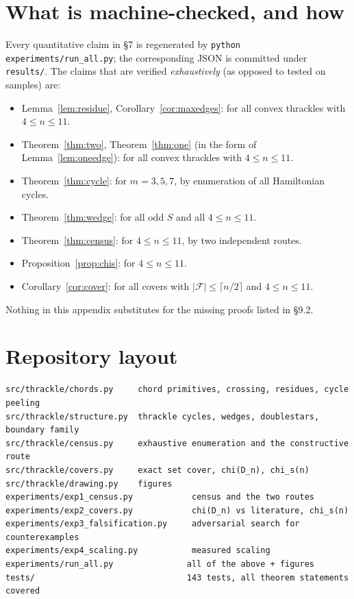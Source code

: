 \documentclass[11pt,a4paper]{article}
\theoremstyle{definition}
\theoremstyle{plain}
\begin{document}
\appendix

\section{What is machine-checked, and how}

Every quantitative claim in §7 is regenerated by
\texttt{python experiments/run\_all.py}; the corresponding JSON is committed
under \texttt{results/}.  The claims that are verified \emph{exhaustively} (as
opposed to tested on samples) are:

\begin{itemize}[leftmargin=*]
\item Lemma~\ref{lem:residue}, Corollary~\ref{cor:maxedges}: for all convex
      thrackles with $4\le n\le11$.
\item Theorem~\ref{thm:two}, Theorem~\ref{thm:one} (in the form of
      Lemma~\ref{lem:oneedge}): for all convex thrackles with $4\le n\le11$.
\item Theorem~\ref{thm:cycle}: for $m=3,5,7$, by enumeration of all
      Hamiltonian cycles.
\item Theorem~\ref{thm:wedge}: for all odd $S$ and all $4\le n\le11$.
\item Theorem~\ref{thm:census}: for $4\le n\le11$, by two independent routes.
\item Proposition~\ref{prop:chis}: for $4\le n\le11$.
\item Corollary~\ref{cor:cover}: for all covers with $|\mathcal{F}|\le\lceil
      n/2\rceil$ and $4\le n\le11$.
\end{itemize}

\noindent Nothing in this appendix substitutes for the missing proofs listed in
§9.2.

\section{Repository layout}

\begin{verbatim}
src/thrackle/chords.py     chord primitives, crossing, residues, cycle peeling
src/thrackle/structure.py  thrackle cycles, wedges, doublestars, boundary family
src/thrackle/census.py     exhaustive enumeration and the constructive route
src/thrackle/covers.py     exact set cover, chi(D_n), chi_s(n)
src/thrackle/drawing.py    figures
experiments/exp1_census.py            census and the two routes
experiments/exp2_covers.py            chi(D_n) vs literature, chi_s(n)
experiments/exp3_falsification.py     adversarial search for counterexamples
experiments/exp4_scaling.py           measured scaling
experiments/run_all.py               all of the above + figures
tests/                               143 tests, all theorem statements covered
\end{verbatim}
\end{document}
